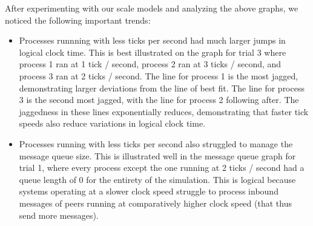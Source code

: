 \documentclass[
	a4paper, %
	10pt, %
	unnumberedsections, %
	twoside, %
]{LTJournalArticle}
\begin{document}
\vspace{1mm}

After experimenting with our scale models and analyzing the above graphs, we noticed the following important trends: 
\begin{itemize}
    \item Processes runnning with less ticks per second had much larger jumps in logical clock time. This is best illustrated on the graph for trial 3 where process 1 ran at 1 tick / second, process 2 ran at 3 ticks / second, and process 3 ran at 2 ticks / second. The line for process 1 is the most jagged, demonstrating larger deviations  from the line of best fit. The line for process 3 is the second most jagged, with the line for process 2 following after. The jaggedness in these lines exponentially reduces, demonstrating that faster tick speeds also reduce variations in logical clock time. 
    \item Processes running with less ticks per second also struggled to manage the message queue size. This is illustrated well in the message queue graph for trial 1, where every process except the one running at 2 ticks / second had a queue length of 0 for the entirety of the simulation. This is logical because systems operating at a slower clock speed struggle to process inbound messages of peers running at comparatively higher clock speed (that thus send more messages).
\end{itemize}







\end{document}
